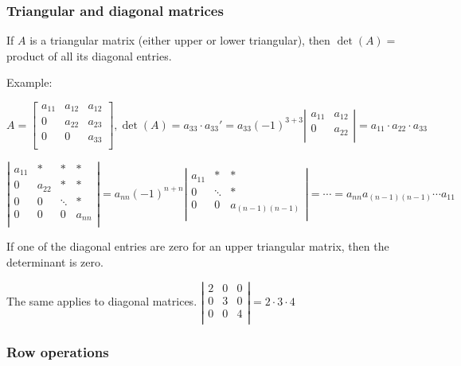 \documentclass[12pt]{article}
\theoremstyle{plain}
\theoremstyle{remark}
\theoremstyle{definition}
\begin{document}
\subsubsection{Triangular and diagonal
matrices}

If \(A\) is a triangular matrix (either upper or lower triangular), then
\(\det(A) =\) product of all its diagonal entries.

Example:

\[{A = \begin{bmatrix}
a_{11} & a_{12} & a_{12} \\
0 & a_{22} & a_{23} \\
0 & 0 & a_{33} \\
\end{bmatrix},\det(A) }{= a_{33} \cdot a_{33}' }{= a_{33}( - 1)^{3 + 3}\left| \begin{matrix}
a_{11} & a_{12} \\
0 & a_{22} \\
\end{matrix} \right| }{= a_{11} \cdot a_{22} \cdot a_{33}} \]

\[{\left| \begin{matrix}
a_{11} & * & * & * \\
0 & a_{22} & * & * \\
0 & 0 & \ddots & * \\
0 & 0 & 0 & a_{nn} \\
\end{matrix} \right| }{= a_{nn}( - 1)^{n + n}\left| \begin{matrix}
a_{11} & * & * \\
0 & \ddots & * \\
0 & 0 & a_{(n - 1)(n - 1)} \\
\end{matrix} \right| }{= \cdots = a_{nn}a_{(n - 1)(n - 1)}\cdots a_{11}} \]

If one of the diagonal entries are zero for an upper triangular matrix,
then the determinant is zero.

The same applies to diagonal matrices. \(\left| \begin{matrix}
2 & 0 & 0 \\
0 & 3 & 0 \\
0 & 0 & 4 \\
\end{matrix} \right| = 2 \cdot 3 \cdot 4\)


\subsubsection{Row operations}
\end{document}
